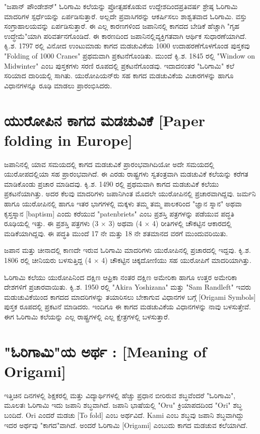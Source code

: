 
"ಜಪಾನ್ ಪೌಂಡೇಶನ್" ಓರಿಗಾಮಿ ಕಲೆಯನ್ನು ಪ್ರೋತ್ಸಹಕೊಡುವ ಉದ್ದೇಶದಿಂದ\break ಪ್ರತಿವರ್ಷ ಶ್ರೇಷ್ಠ ಓರಿಗಾಮಿ ಮಾದರಿಗಳ ಸ್ಪರ್ಧೆಯನ್ನು ಏರ್ಪಡಿಸುತ್ತಾರೆ. ಅಲ್ಲದೇ ಪ್ರವಾಸಿ\break ಗರನ್ನು ಆಕರ್ಷಿಸಲು ಶಾಶ್ವತವಾದ ಓರಿಗಾಮಿ. ವಸ್ತು ಸಂಗ್ರಾಹಾಲಯವನ್ನು ಏರ್ಪಡಿಸುತ್ತಾರೆ. ಈ ಎಲ್ಲ ಕಾರಣಗಳಿಂದ ಜಪಾನಿನಲ್ಲಿ ಕಾಗದದ ಬೇಡಿಕೆ ಹೆಚ್ಚಾಗಿ "ಗೃಹ ಉದ್ಧೇಮೆ" ಯಾಗಿ ಪರಿವರ್ತನಗೊಂಡಿದೆ. ಈ ಕಾರಣದಿಂದ ಜಪಾನಿನಲ್ಲಿ\break ವ್ಯಕ್ತಿಗತವಾಗಿ ಆರ್ಥಿಕ ಸುಧಾರಣೆಯಾಗಿದೆ. ಕಿೃ.ಶ. 1797 ರಲ್ಲಿ ವಿನೋದ ಉಂಟುಮಾಡು ಕಾಗದ ಮಡಚುವಿಕೆಯ 1000 ಉದಾಹರಣೆಗೊಳಗೊಂಡ ಪುಸ್ತಕವು "Folding of 1000 Cranes"  ಪ್ರಥಮವಾಗಿ ಪ್ರಕಟನೆಗೊಂಡಿತು. ಮುಂದೆ ಕಿೃ.ಶ. 1845 ರಲ್ಲಿ "Window on Midwinter" ಎಂಬ ಪುಸ್ತಕಗಳು ಸರಣಿ ರೂಪದಲ್ಲಿ ಪ್ರಕಟನೆಗೊಂಡವು. ಇದಾದ\break ನಂತರ "ಓರಿಗಾಮಿ" ಕಲೆ ಸರಿಯಾದ ದಾರಿಯಲ್ಲಿ ಸಾಗಿತು. ಯುರೋಪಿಯನ್‌ರು ಸಹ ಕಾಗದ ಮಡಚುವಿಕೆಯ ವಿಚಾರಗಳನ್ನು ಹಾಗೂ ವಿಧಾನಗಳನ್ನೂ ರೂಢಿ ಮಾಡಲು ಪ್ರಾರಂಭಿ\break ಸಿದರು.

\section*{ಯುರೋಪಿನ ಕಾಗದ ಮಡಚುವಿಕೆ [Paper folding in Europe]}
ಜಪಾನಿನಲ್ಲಿ ಯಾವ ಸಮಯದಲ್ಲಿ ಕಾಗದ ಮಡಚುವಿಕೆ ಪ್ರಾರಂಭವಾಗಿದಿಯೋ ಅದೇ ಸಮಯದಲ್ಲಿ ಯುರೋಪದಲ್ಲಿಯಾ ಸಹ ಪ್ರಾರಂಭವಾಗಿದೆ. ಈ ಎರಡು ರಾಷ್ಟ್ರಗಳು ಸ್ವತಂತ್ರವಾಗಿ ಮಡಚುವಿಕೆ ಕಲೆಯನ್ನು ಕರೆಗತ ಮಾಡಿಕೊಂಡು ಪ್ರಚಾರ ಮಾಡಿದವು. ಕಿೃ.ಶ. 1490 ರಲ್ಲಿ ಪ್ರಥಮವಾಗಿ ಕಾಗದ ಮಡಚುವಿಕೆ ಕಲೆಯು ಪ್ರಕಟನೆಯಾಗಿತ್ತು. ಅದರ ಕೆಲವು ಮಾದರಿಗಳು ಜಪಾನಿಗಿಂತ ಮೊದಲೇ ಯುರೋಪಿನಲ್ಲಿ ಪ್ರಚಾರವಾಗಿದ್ದವು. ಜರ್ಮನಿ ಹಾಗೂ ಯುರೋಪಿನಲ್ಲಿ ಹಾಗೂ ಇತರ ಭಾಗಗಳಲ್ಲಿ ಮಕ್ಕಳು ತಮ್ಮ ತಮ್ಮ ಪಾಲಕರಿಂದ "ಜ್ಞಾನ ಸ್ನಾನ" ಅಥವಾ ಕೃಸ್ತಸ್ನಾನ [baptism]  ಎಂದು ಕರೆಯುವ "patenbriets" ಎಂಬ ಪ್ರಶಸ್ತಿ ಪತ್ರಗಳನ್ನು ಪಡೆಯುವ ಪದ್ಧತಿ ರೂಢಿಯಲ್ಲಿ ಇತ್ತು. ಈ ಪ್ರಶಸ್ತಿ ಪತ್ರಗಳು (3 $\times$ 3) ಅಥವಾ  (4 $\times$ 4)  ರೀತಿಗಳಲ್ಲಿ ಚೌಕಟ್ಟಿನ ಆಕಾರದಲ್ಲಿ ಮಡಿಕೆಯಾಗಿದ್ದವು. ಈ ಪದ್ಧತಿ ಮುಂದೆ 17 ನೇ ಮತ್ತು 18 ನೇ ಶತಮಾನದ ವರಗೆ ಮುಂದುವರಿಯಿತು. 

\medskip

ಜಪಾನ ಮತ್ತು ಚೀನಾದಲ್ಲಿ ಕಾಣದೇ ಇರುವ ಓರಿಗಾಮಿ ಮಾದರಿಗಳು ಯುರೋಪಿ\break ನಲ್ಲಿ ಪ್ರಚಾರದಲ್ಲಿ ಇದ್ದವು. ಕಿೃ.ಶ. 1806 ರಲ್ಲಿ ಚೀನಿಯರು ಬಳಸುತ್ತಿದ್ದ (4 $\times$ 4) ಚೌಕಟ್ಟಿನ ಚಿಕ್ಕದೋಣಿಯು ಸಹ ಯುರೋಪಿಗೆ ಮಾದರಿಯಾಗಿತ್ತು.

\medskip

ಓರಿಗಾಮಿ ಕಲೆಯು ಯುರೋಪಿನಿಂದ ದಕ್ಷಿಣ ಆಫ್ರಿಕಾ ನಂತರ ದಕ್ಷಿಣ ಅಮೇರಿಕಾ ಹಾಗೂ ಉತ್ತರ ಅಮೇರಿಕಾ ದೇಶಗಳಿಗೆ ಪ್ರಚಾರವಾಯಿತು. ಕಿೃ.ಶ. 1950 ರಲ್ಲಿ  "Akira Yoshizana" ಮತ್ತು "Sam Randleft"  ಇವರು ಮಡುಚುವಿಕೆಯಿಂದ ಕಾಗದದ ಮಾದರಿಗಳನ್ನು ತಯಾರಿಸಲು ಬೇಕಾಗುವ ವಿಧಾನಗಳ ಬಗ್ಗೆ  [Origami Symbols] ಪುಸ್ತಕ ರೂಪದಲ್ಲಿ ಪ್ರಕಟನೆ ಮಾಡಿದರು. ಇಂದಿಗೂ ಈ ಕಾಗದ ಮಡಚುವಿಕೆಯ ವಿಧಾನಗಳನ್ನು ನಾವು ಬಳಸುತ್ತೇವೆ. ಈಗ ಓರಿಗಾಮಿ ಕಲೆಯನ್ನು ಎಲ್ಲ ರಾಷ್ಟ್ರಗಳಲ್ಲಿ ಎಲ್ಲ ಕ್ಷೇತ್ರಗಳಲ್ಲಿ ಬಳಸುತ್ತಾರೆ. 


\section*{"ಓರಿಗಾಮಿ"ಯ  ಅರ್ಥ : [Meaning of Origami]}
ಇತ್ತಿಚಿನ ದಿನಗಳಲ್ಲಿ ಶಿಕ್ಷಕರಲ್ಲಿ ಮತ್ತು ವಿದ್ಯಾರ್ಥಿಗಳಲ್ಲಿ ಹೆಚ್ಚು ಪ್ರಧಾನ ಬೀರಿರುವ ಶಬ್ಧವೆಂದರೆ "ಓರಿಗಾಮಿ", ಮೂಲತಃ ಓರಿಗಾಮಿ ಇದು ಜಪಾನಿ ಶಬ್ಧವಾಗಿದೆ. ಜಪಾನಿ ಭಾಷೆಯಲ್ಲಿ "Oru" ಕ್ರಿಯಾಪದದಿಂದ "Ori" ಶಬ್ಧ ಬಂದಿದೆ. Ori ಎಂದರೆ ಮಡಚು  [To fold] ಎಂಬ ಅರ್ಥವಿದೆ.  Kami ಎಂಬ ಶಬ್ಧವು ಜಪಾನಿ ಶಬ್ಧವಾಗಿದ್ದು ಇದರ ಅರ್ಥವು "ಕಾಗದ"ವಾಗಿದೆ. ಅಂದರೆ ಓರಿಗಾಮಿ [Origami] ಎಂಬುದು ಕಾಗದ ಮಡಚುವ ಕಲೆಯಾಗಿದೆ. 

